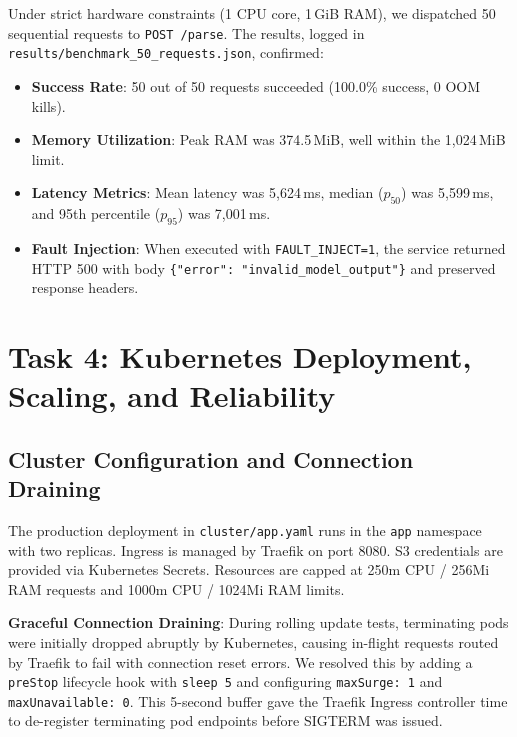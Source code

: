\documentclass[10pt,a4paper]{article}
\begin{document}
Under strict hardware constraints (1 CPU core, 1\,GiB RAM), we dispatched 50 sequential requests to \texttt{POST /parse}. The results, logged in \texttt{results/benchmark\_50\_requests.json}, confirmed:
\begin{itemize}
    \item \textbf{Success Rate}: 50 out of 50 requests succeeded (100.0\% success, 0 OOM kills).
    \item \textbf{Memory Utilization}: Peak RAM was 374.5\,MiB, well within the 1,024\,MiB limit.
    \item \textbf{Latency Metrics}: Mean latency was 5,624\,ms, median ($p_{50}$) was 5,599\,ms, and 95th percentile ($p_{95}$) was 7,001\,ms.
    \item \textbf{Fault Injection}: When executed with \texttt{FAULT\_INJECT=1}, the service returned HTTP 500 with body \texttt{\{"error": "invalid\_model\_output"\}} and preserved response headers.
\end{itemize}

\section{Task 4: Kubernetes Deployment, Scaling, and Reliability}
\subsection{Cluster Configuration and Connection Draining}
The production deployment in \texttt{cluster/app.yaml} runs in the \texttt{app} namespace with two replicas. Ingress is managed by Traefik on port 8080. S3 credentials are provided via Kubernetes Secrets. Resources are capped at 250m CPU / 256Mi RAM requests and 1000m CPU / 1024Mi RAM limits.

\noindent\textbf{Graceful Connection Draining}: During rolling update tests, terminating pods were initially dropped abruptly by Kubernetes, causing in-flight requests routed by Traefik to fail with connection reset errors. We resolved this by adding a \texttt{preStop} lifecycle hook with \texttt{sleep 5} and configuring \texttt{maxSurge: 1} and \texttt{maxUnavailable: 0}. This 5-second buffer gave the Traefik Ingress controller time to de-register terminating pod endpoints before SIGTERM was issued.
\end{document}
